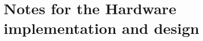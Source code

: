 \chapter{Notes for the Hardware implementation and design}
\hypertarget{md_Documentation_2Hardware_2Hardware__Notes}{}\label{md_Documentation_2Hardware_2Hardware__Notes}
\label{md_Documentation_2Hardware_2Hardware__Notes_autotoc_md8}%
%
